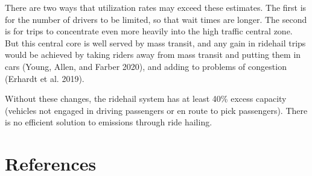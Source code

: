 \documentclass[
  letterpaper,
]{article}
\begin{document}
There are two ways that utilization rates may exceed these estimates.
The first is for the number of drivers to be limited, so that wait times
are longer. The second is for trips to concentrate even more heavily
into the high traffic central zone. But this central core is well served
by mass transit, and any gain in ridehail trips would be achieved by
taking riders away from mass transit and putting them in cars (Young,
Allen, and Farber 2020), and adding to problems of congestion (Erhardt
et al. 2019).

Without these changes, the ridehail system has at least 40\% excess
capacity (vehicles not engaged in driving passengers or en route to pick
passengers). There is no efficient solution to emissions through ride
hailing.

\hypertarget{references}{%
\section*{References}\label{references}}
\end{document}
